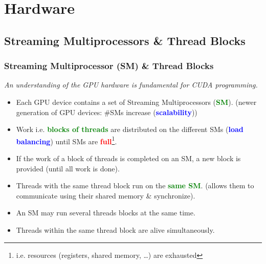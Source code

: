 \section{Hardware}






\subsection{Streaming Multiprocessors \& Thread Blocks}
\begin{frame}
	\frametitle{Streaming Multiprocessor (SM) \& Thread Blocks}
\textit{An understanding of the GPU hardware is fundamental for CUDA programming.}
\begin{itemize}
\item Each GPU device contains a set of Streaming Multiprocessors (\textbf{\textcolor{green}{SM}}).\newline
      (newer generation of GPU devices: \#SMs increase (\textbf{\textcolor{blue}{scalability}}))
\item Work i.e. \textbf{\textcolor{green}{blocks of threads}} are distributed on the different SMs\newline
	(\textbf{\textcolor{blue}{load balancing}}) until SMs are \textbf{\textcolor{red}{full}}\footnote{i.e. resources (registers, shared memory, \ldots) are exhausted}.
\item If the work of a block of threads is completed on an SM, a new block is provided (until all work is done).  		
\item Threads with the same thread block run on the \textbf{\textcolor{green}{same SM}}.\newline
	(allows them to communicate using their shared memory \& synchronize).
\item An SM may run several threads blocks at the same time.
\item Threads within the same thread block are alive simultaneously. 
\end{itemize}
\end{frame} 

